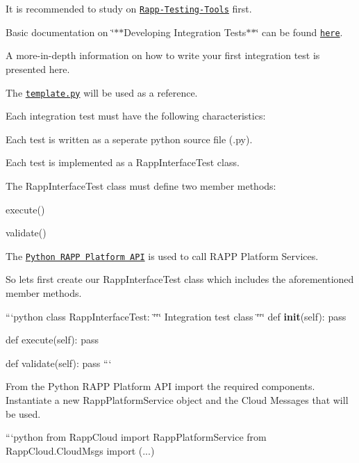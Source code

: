 It is recommended to study on \href{https://github.com/rapp-project/rapp-platform/wiki/RAPP-Testing-Tools}{\tt Rapp-\/\-Testing-\/\-Tools} first.

Basic documentation on \char`\"{}$\ast$$\ast$\-Developing Integration Tests$\ast$$\ast$\char`\"{} can be found \href{https://github.com/rapp-project/rapp-platform/tree/master/rapp_testing_tools}{\tt here}.

A more-\/in-\/depth information on how to write your first integration test is presented here.

The \href{https://github.com/rapp-project/rapp-platform/blob/master/rapp_testing_tools/scripts/default_tests/template.py}{\tt template.\-py} will be used as a reference.

Each integration test must have the following characteristics\-:


\begin{DoxyItemize}
\item Each test is written as a seperate python source file (.py).
\item Each test is implemented as a Rapp\-Interface\-Test class.
\item The Rapp\-Interface\-Test class must define two member methods\-:
\begin{DoxyItemize}
\item execute()
\item validate()
\end{DoxyItemize}
\item The \href{https://github.com/rapp-project/rapp-api/tree/master/python}{\tt Python R\-A\-P\-P Platform A\-P\-I} is used to call R\-A\-P\-P Platform Services.
\end{DoxyItemize}

So lets first create our Rapp\-Interface\-Test class which includes the aforementioned member methods.

```python class Rapp\-Interface\-Test\-: \char`\"{}\char`\"{}\char`\"{} Integration test class \char`\"{}\char`\"{}\char`\"{} def {\bfseries init}(self)\-: pass

def execute(self)\-: pass

def validate(self)\-: pass ```

From the Python R\-A\-P\-P Platform A\-P\-I import the required components. Instantiate a new {\ttfamily Rapp\-Platform\-Service} object and the Cloud Messages that will be used.

```python from Rapp\-Cloud import Rapp\-Platform\-Service from Rapp\-Cloud.\-Cloud\-Msgs import (...)

